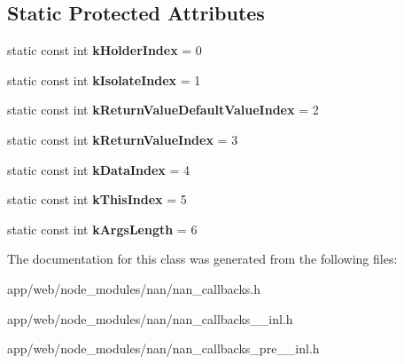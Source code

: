 \subsection*{Static Protected Attributes}
\begin{DoxyCompactItemize}
\item 
\mbox{\label{class_property_callback_info_aa25d0382359713002b22662cb4936540}} 
static const int {\bfseries k\+Holder\+Index} = 0
\item 
\mbox{\label{class_property_callback_info_a38d2c8b4f158fcf298a31440386e8225}} 
static const int {\bfseries k\+Isolate\+Index} = 1
\item 
\mbox{\label{class_property_callback_info_abfa3ce1967972d9bda243266080131c8}} 
static const int {\bfseries k\+Return\+Value\+Default\+Value\+Index} = 2
\item 
\mbox{\label{class_property_callback_info_a7d4a663042a1d995488b3437646fa252}} 
static const int {\bfseries k\+Return\+Value\+Index} = 3
\item 
\mbox{\label{class_property_callback_info_ac8d22a775e2066ffaba6bc547951f32b}} 
static const int {\bfseries k\+Data\+Index} = 4
\item 
\mbox{\label{class_property_callback_info_a237c927b180488bc7f7c9462eaca1e66}} 
static const int {\bfseries k\+This\+Index} = 5
\item 
\mbox{\label{class_property_callback_info_a5cc97ff5a5ae3d911952f0584bc7090c}} 
static const int {\bfseries k\+Args\+Length} = 6
\end{DoxyCompactItemize}


The documentation for this class was generated from the following files\+:\begin{DoxyCompactItemize}
\item 
app/web/node\+\_\+modules/nan/nan\+\_\+callbacks.\+h\item 
app/web/node\+\_\+modules/nan/nan\+\_\+callbacks\+\_\+\_\+inl.\+h\item 
app/web/node\+\_\+modules/nan/nan\+\_\+callbacks\+\_\+pre\+\_\+\_\+inl.\+h\end{DoxyCompactItemize}
